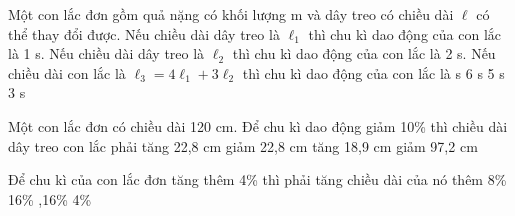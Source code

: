 

\begin{ex}%
Một con lắc đơn gồm quả nặng có khối lượng m và dây treo có chiều dài $\ell$ có thể thay đổi được. Nếu chiều dài dây treo là $\ell_1$ thì chu kì dao động của con lắc là 1 s. Nếu chiều dài dây treo là $\ell_2$ thì chu kì dao động của con lắc là 2 s. Nếu chiều dài con lắc là $\ell_3= 4\ell_1+ 3\ell_2$ thì chu kì dao động của con lắc là
\choice
{ s}
{6 s}
{5 s}
{3 s}
\end{ex} 



\begin{ex}%
Một con lắc đơn có chiều dài 120 cm. Để chu kì dao động giảm 10\% thì chiều dài dây treo con lắc phải
\choice
{tăng 22,8 cm}
{\True giảm 22,8 cm}
{tăng 18,9 cm}
{giảm 97,2 cm}
\end{ex} 

\begin{ex} %
Để chu kì của con lắc đơn tăng thêm 4\% thì phải tăng chiều dài của nó thêm
\choice
{8\%}
{16\%}
{,16\%}
{4\%}

\end{ex} 



